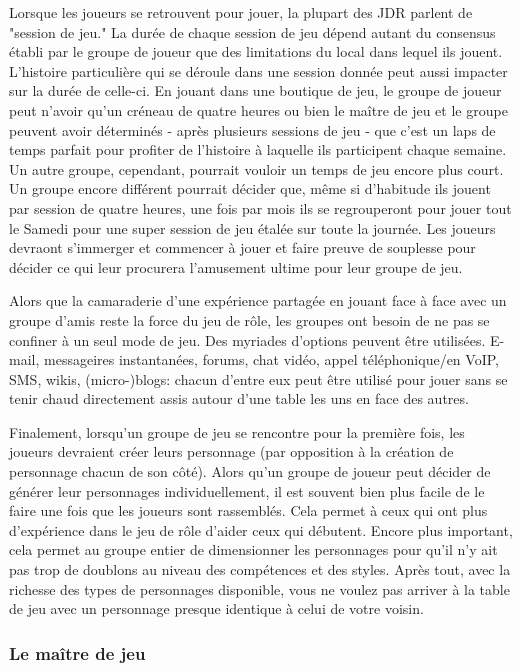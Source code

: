 Lorsque les joueurs se retrouvent pour jouer, la plupart des JDR parlent de "session de jeu." La durée de chaque session de jeu dépend autant du consensus établi par le groupe de joueur que des limitations du local dans lequel ils jouent. L'histoire particulière qui se déroule dans une session donnée peut aussi impacter sur la durée de celle-ci. En jouant dans une boutique de jeu, le groupe de joueur peut n'avoir qu'un créneau de quatre heures ou bien le maître de jeu et le groupe peuvent avoir déterminés - après plusieurs sessions de jeu - que c'est un laps de temps parfait pour profiter de l'histoire à laquelle ils participent chaque semaine. Un autre groupe, cependant, pourrait vouloir un temps de jeu encore plus court. Un groupe encore différent pourrait décider que, même si d'habitude ils jouent par session de quatre heures, une fois par mois ils se regrouperont pour jouer tout le Samedi pour une super session de jeu étalée sur toute la journée. Les joueurs devraont s'immerger et commencer à jouer et faire preuve de souplesse pour décider ce qui leur procurera l'amusement ultime pour leur groupe de jeu. 

Alors que la camaraderie d'une expérience partagée en jouant face à face avec un groupe d'amis reste la force du jeu de rôle, les groupes ont besoin de ne pas se confiner à un seul mode de jeu. Des myriades d'options peuvent être utilisées. E-mail, messageires instantanées, forums, chat vidéo, appel téléphonique/en VoIP, SMS, wikis, (micro-)blogs: chacun d'entre eux peut être utilisé pour jouer sans se tenir chaud directement assis autour d'une table les uns en face des autres. 

Finalement, lorsqu'un groupe de jeu se rencontre pour la première fois, les joueurs devraient créer leurs personnage (par opposition à la création de personnage chacun de son côté). Alors qu'un groupe de joueur peut décider de générer leur personnages individuellement, il est souvent bien plus facile de le faire une fois que les joueurs sont rassemblés. Cela permet à ceux qui ont plus d'expérience dans le jeu de rôle d'aider ceux qui débutent. Encore plus important, cela permet au groupe entier de dimensionner les personnages pour qu'il n'y ait pas trop de doublons au niveau des compétences et des styles. Après tout, avec la richesse des types de personnages disponible, vous ne voulez pas arriver à la table de jeu avec un personnage presque identique à celui de votre voisin. 

\subsubsection{Le maître de jeu} \label{sec:gamemaster} 

